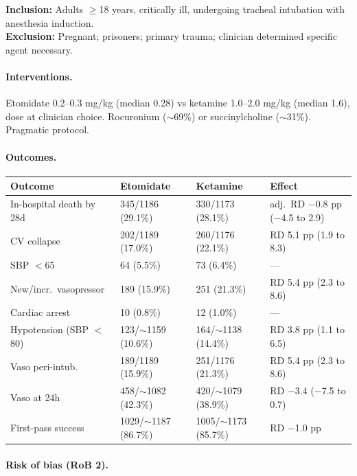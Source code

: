 \documentclass[11pt]{article}
\begin{document}
\noindent\textbf{Inclusion:} Adults $\geq$18 years, critically ill, undergoing tracheal intubation with anesthesia induction.\\
\textbf{Exclusion:} Pregnant; prisoners; primary trauma; clinician determined specific agent necessary.

\paragraph{Interventions.}
Etomidate 0.2--0.3 mg/kg (median 0.28) vs ketamine 1.0--2.0 mg/kg (median 1.6), dose at clinician choice. Rocuronium ($\sim$69\%) or succinylcholine ($\sim$31\%). Pragmatic protocol.

\paragraph{Outcomes.}

\begin{table}[H]
\centering\footnotesize
\begin{tabularx}{\textwidth}{L{4cm} C{2.5cm} C{2.5cm} X}
\toprule
\textbf{Outcome} & \textbf{Etomidate} & \textbf{Ketamine} & \textbf{Effect} \\
\midrule
In-hospital death by 28d & 345/1186 (29.1\%) & 330/1173 (28.1\%) & adj.\ RD $-$0.8 pp ($-$4.5 to 2.9) \\
CV collapse & 202/1189 (17.0\%) & 260/1176 (22.1\%) & RD 5.1 pp (1.9 to 8.3) \\
\quad SBP $<$65 & 64 (5.5\%) & 73 (6.4\%) & --- \\
\quad New/incr.\ vasopressor & 189 (15.9\%) & 251 (21.3\%) & RD 5.4 pp (2.3 to 8.6) \\
\quad Cardiac arrest & 10 (0.8\%) & 12 (1.0\%) & --- \\
Hypotension (SBP $<$80) & 123/$\sim$1159 (10.6\%) & 164/$\sim$1138 (14.4\%) & RD 3.8 pp (1.1 to 6.5) \\
Vaso peri-intub. & 189/1189 (15.9\%) & 251/1176 (21.3\%) & RD 5.4 pp (2.3 to 8.6) \\
Vaso at 24h & 458/$\sim$1082 (42.3\%) & 420/$\sim$1079 (38.9\%) & RD $-$3.4 ($-$7.5 to 0.7) \\
First-pass success & 1029/$\sim$1187 (86.7\%) & 1005/$\sim$1173 (85.7\%) & RD $-$1.0 pp \\
\bottomrule
\end{tabularx}
\end{table}

\paragraph{Risk of bias (RoB 2).}
\end{document}
